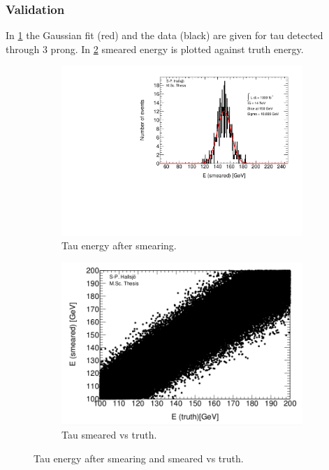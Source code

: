 \documentclass[handout]{beamer}
\begin{document}
\begin{frame}[shrink=10]\frametitle{Validation}
\begin{block}{}
In \ref{fig:tau:1} the Gaussian fit (red) and the data (black) are given for tau detected through 3 prong. In \ref{fig:tau:2} smeared energy is plotted against truth energy. 
\end{block}
\begin{figure}
        \centering
        \begin{subfigure}[b]{0.45\textwidth}
                \includegraphics[width=\textwidth]{tau.pdf}
                \caption{Tau energy after smearing.}
                \label{fig:tau:1}
        \end{subfigure}
        \hfill
        \begin{subfigure}[b]{0.45\textwidth}
                 \includegraphics[width=\textwidth]{tau2.png}
                \caption{Tau smeared vs truth.}
                \label{fig:tau:2}
                 \end{subfigure}
    \caption{Tau energy after smearing and smeared vs truth.}
    \label{fig:tau}
           
\end{figure}

\end{frame}
\end{document}
